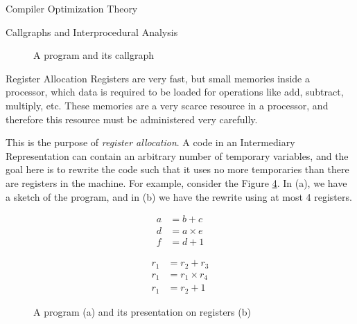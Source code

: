 \begin{section}{Compiler Optimization Theory}
\begin{subsection}{Callgraphs and Interprocedural Analysis}
\begin{figure}[ht]
\begin{subfigure}[b]{0.40\textwidth}
\begin{center}
{
    }
    \end{center}
  \end{subfigure}
  \caption{A program and its callgraph}
  \label{fig:call_graph}
\end{figure}

\end{subsection}

\begin{subsection}{Register Allocation}
	Registers are very fast, but small memories inside a processor, which data is
	required to be loaded for operations like add, subtract, multiply, etc. These
	memories are a very scarce resource in a processor, and therefore this resource
	must be administered very carefully.

This is the purpose of \textit{register allocation}. A code in an Intermediary
Representation can contain an arbitrary number of temporary variables, and the
goal here is to rewrite the code such that it uses no more temporaries than
there are registers in the machine. For example, consider the Figure
\ref{fig:register_ir}. In (a), we have a sketch of the program, and in (b) we
have the rewrite using at most 4 registers.

\begin{figure}[ht]
    \centering
    \begin{subfigure}[b]{0.40\textwidth}
		\begin{align}
			a &= b + c      \nonumber \\
			d &= a \times e \nonumber \\
			f &= d + 1      \nonumber
		\end{align}
        \caption{\label{fig:code_normal}}
    \end{subfigure}
    \begin{subfigure}[b]{0.40\textwidth}
		\begin{align}
			r_1 &= r_2 + r_3      \nonumber \\
			r_1 &= r_1 \times r_4 \nonumber \\
			r_1 &= r_2 + 1        \nonumber
		\end{align}
        \caption{\label{fig:code_register}}
\end{subfigure}
\caption{A program (a) and its presentation on registers (b)}
\label{fig:register_ir}
\end{figure}


\end{subsection}
\end{section}
